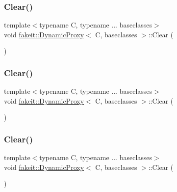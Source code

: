 \subsubsection{\texorpdfstring{Clear()}{Clear()}\hspace{0.1cm}{\footnotesize\ttfamily [6/9]}}
{\footnotesize\ttfamily template$<$typename C, typename ... baseclasses$>$ \\
void \mbox{\hyperlink{structfakeit_1_1DynamicProxy}{fakeit\+::\+Dynamic\+Proxy}}$<$ C, baseclasses $>$\+::Clear (\begin{DoxyParamCaption}{ }\end{DoxyParamCaption})\hspace{0.3cm}{\ttfamily [inline]}}

\mbox{\label{structfakeit_1_1DynamicProxy_a995c7e3dd97dc7707f18774eb4554b45}} 
\subsubsection{\texorpdfstring{Clear()}{Clear()}\hspace{0.1cm}{\footnotesize\ttfamily [7/9]}}
{\footnotesize\ttfamily template$<$typename C, typename ... baseclasses$>$ \\
void \mbox{\hyperlink{structfakeit_1_1DynamicProxy}{fakeit\+::\+Dynamic\+Proxy}}$<$ C, baseclasses $>$\+::Clear (\begin{DoxyParamCaption}{ }\end{DoxyParamCaption})\hspace{0.3cm}{\ttfamily [inline]}}

\mbox{\label{structfakeit_1_1DynamicProxy_a995c7e3dd97dc7707f18774eb4554b45}} 
\subsubsection{\texorpdfstring{Clear()}{Clear()}\hspace{0.1cm}{\footnotesize\ttfamily [8/9]}}
{\footnotesize\ttfamily template$<$typename C, typename ... baseclasses$>$ \\
void \mbox{\hyperlink{structfakeit_1_1DynamicProxy}{fakeit\+::\+Dynamic\+Proxy}}$<$ C, baseclasses $>$\+::Clear (\begin{DoxyParamCaption}{ }\end{DoxyParamCaption})\hspace{0.3cm}{\ttfamily [inline]}}

